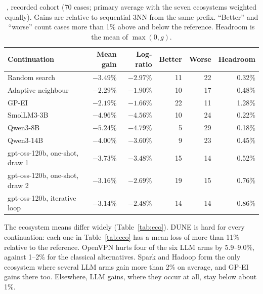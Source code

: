 \begin{table}[t]
\centering
\caption{, recorded cohort (70 cases; primary average with the seven ecosystems weighted equally). Gains are relative to sequential 3NN from the same prefix. ``Better'' and ``worse'' count cases more than 1\% above and below the reference. Headroom is the mean of $\max(0,g)$.}
\label{tab:rq1}
\small
\begin{tabular}{lrrrrr}
\toprule
Continuation & Mean gain & Log-ratio & Better & Worse & Headroom \\
\midrule
Random search & $-3.49\%$ & $-2.97\%$ & 11 & 22 & 0.32\% \\
Adaptive neighbour & $-2.29\%$ & $-1.90\%$ & 10 & 17 & 0.48\% \\
GP-EI & $-2.19\%$ & $-1.66\%$ & 22 & 11 & 1.28\% \\
\midrule
SmolLM3-3B & $-4.96\%$ & $-4.56\%$ & 10 & 24 & 0.22\% \\
Qwen3-8B & $-5.24\%$ & $-4.79\%$ & 5 & 29 & 0.18\% \\
Qwen3-14B & $-4.00\%$ & $-3.60\%$ & 9 & 23 & 0.45\% \\
gpt-oss-120b, one-shot, draw 1 & $-3.73\%$ & $-3.48\%$ & 15 & 14 & 0.52\% \\
gpt-oss-120b, one-shot, draw 2 & $-3.16\%$ & $-2.69\%$ & 19 & 15 & 0.76\% \\
gpt-oss-120b, iterative loop & $-3.14\%$ & $-2.48\%$ & 14 & 14 & 0.86\% \\
\bottomrule
\end{tabular}
\end{table}

The ecosystem means differ widely (Table~\ref{tab:eco}). DUNE is hard for every continuation: each one in Table~\ref{tab:eco} has a mean loss of more than 11\% relative to the reference. OpenVPN hurts four of the six LLM arms by 5.9--9.0\%, against 1--2\% for the classical alternatives. Spark and Hadoop form the only ecosystem where several LLM arms gain more than 2\% on average, and GP-EI gains there too. Elsewhere, LLM gains, where they occur at all, stay below about 1\%.

